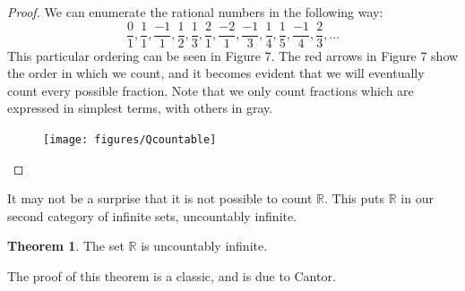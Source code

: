 \documentclass{article}
\newcommand{\R}{\mathbb{R}}
\theoremstyle{definition}
\newtheorem{theorem}{Theorem}[section]
\begin{document}
	\begin{proof}
		We can enumerate the rational numbers in the following way: $$ \frac{0}{1},\frac{1}{1},\frac{-1}{1},\frac{1}{2}, \frac{1}{3}, \frac{2}{1}, \frac{-2}{1}, \frac{-1}{3}, \frac{1}{4}, \frac{1}{5}, \frac{-1}{4}, \frac{2}{3},\ldots $$ This particular ordering can be seen in Figure 7. The red arrows in Figure 7 show the order in which we count, and it becomes evident that we will eventually count every possible fraction. Note that we only count fractions which are expressed in simplest terms, with others in gray. 
		\begin{figure}[h!]
			\centering
			\texttt{[image: figures/Qcountable]}
			\caption{}
			\label{fig:qcountable}
		\end{figure}
	\end{proof}
	It may not be a surprise that it is not possible to count $ \R $. This puts $ \R $ in our second category of infinite sets, uncountably infinite.
	\begin{theorem}
		The set $ \R $ is uncountably infinite. 
	\end{theorem}
	The proof of this theorem is a classic, and is due to Cantor. 
\end{document}
